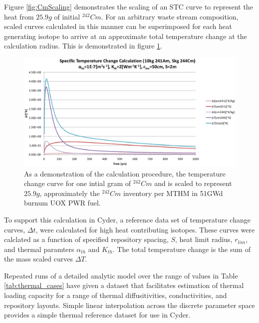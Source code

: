 Figure \ref{fig:CmScaling} demonstrates the scaling of an STC curve to represent 
the heat from $25.9g$ of initial $^{242}Cm$. For an arbitrary waste stream 
composition, scaled curves calculated in this manner can be superimposed for 
each heat generating isotope to arrive at an approximate total temperature 
change at the calculation radius. This is demonstrated in figure 
\ref{fig:fakeArbitraryWF}.

\begin{figure}[htp!]
\begin{center}
\includegraphics[width=0.8\columnwidth]{images/fakeArbitraryWF.eps}
\end{center}
\caption{As a demonstration of the calculation procedure, the temperature change 
  curve for one intial gram of $^{242}Cm$ and is scaled to represent $25.9g$, 
  approximately the $^{242}Cm$ inventory per MTHM in 51GWd burnum UOX PWR fuel. }
\label{fig:fakeArbitraryWF}
\end{figure}

To support this calculation in Cyder, a reference data set of temperature change 
curves, $\Delta t$, were calculated for high heat contributing isotopes. These 
curves were calclated as a function of specified repository spacing, $S$, heat limit radius, $r_{lim}$, and thermal paramters $\alpha_{th}$ and $K_{th}$. The total temperature change is the sum of the mass scaled curves $\Delta T$.



Repeated runs of a detailed analytic model over the range of values in Table 
\ref{tab:thermal_cases} have given a dataset that 
facilitates estimation of thermal loading capacity for a range of thermal 
diffusitivities, conductivities, and repository layouts. Simple linear 
interpolation across the discrete parameter space provides a simple thermal 
reference dataset for use in Cyder.
